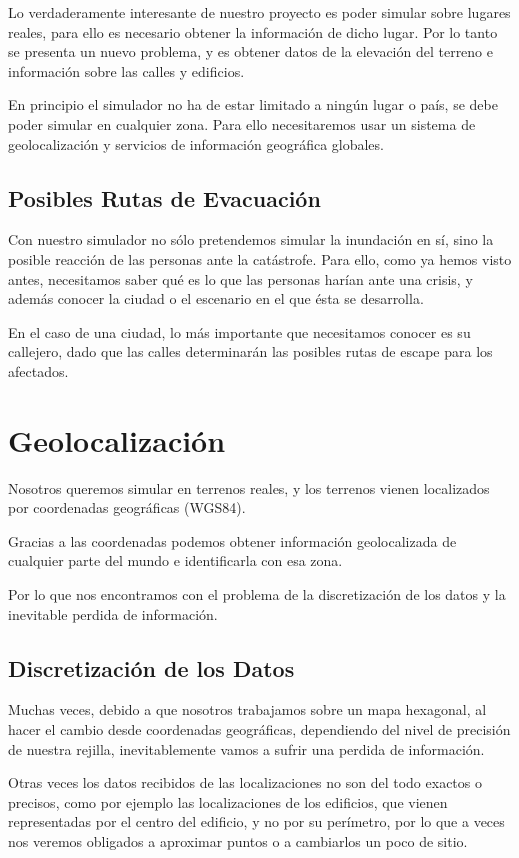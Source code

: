 Lo verdaderamente interesante de nuestro proyecto es poder simular sobre
lugares reales, para ello es necesario obtener la información de dicho lugar.
Por lo tanto se presenta un nuevo problema, y es obtener datos de la elevación
del terreno e información sobre las calles y edificios.

En principio el simulador no ha de estar limitado a ningún lugar o país, se
debe poder simular en cualquier zona. Para ello necesitaremos usar un sistema de
geolocalización y servicios de información geográfica globales.

\subsection*{Posibles Rutas de Evacuación}

Con nuestro simulador no sólo pretendemos simular la inundación en sí, sino la
posible reacción de las personas ante la catástrofe. Para ello, como ya hemos
visto antes, necesitamos saber qué es lo que las personas harían ante una
crisis, y además conocer la ciudad o el escenario en el que ésta se desarrolla.

En el caso de una ciudad, lo más importante que necesitamos conocer es su
callejero, dado que las calles determinarán las posibles rutas de escape para
los afectados.

\section*{Geolocalización}

Nosotros queremos simular en terrenos reales, y los terrenos vienen
localizados por coordenadas geográficas (WGS84).

Gracias a las coordenadas podemos obtener información geolocalizada de
cualquier parte del mundo e identificarla con esa zona.

Por lo que nos encontramos con el problema de la discretización de los
datos y la inevitable perdida de información.

\subsection*{Discretización de los Datos}
Muchas veces, debido a que nosotros trabajamos sobre un mapa hexagonal, al
hacer el cambio desde coordenadas geográficas, dependiendo del nivel de
precisión de nuestra rejilla, inevitablemente vamos a sufrir una perdida de
información.

Otras veces los datos recibidos de las localizaciones no son del todo exactos o
precisos, como por ejemplo las localizaciones de los edificios, que vienen
representadas por el centro del edificio, y no por su perímetro, por lo que a
veces nos veremos obligados a aproximar puntos o a cambiarlos un poco de sitio.

